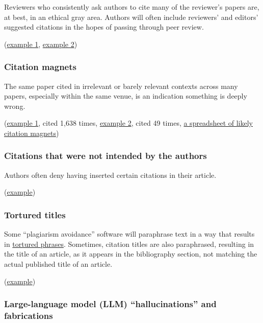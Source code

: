 \documentclass[letterpaper, 12pt]{article}
\begin{document}
Reviewers who consistently ask authors to cite many of the reviewer's papers are, at best, in an ethical gray area. Authors will often include reviewers' and editors' suggested citations in the hopes of passing through peer review.

(\href{https://pubpeer.com/publications/90719DBC6E5FF2AC32FDE74F1A6A7F}{example 1}, \href{https://pubpeer.com/publications/1924F147DE045B97261004EB2387AE}{example 2})

\subsubsection*{Citation magnets}

The same paper cited in irrelevant or barely relevant contexts across many papers,
especially within the same venue, is an indication something is deeply wrong. 

(\href{https://pubpeer.com/search?q=%22A+novel+Aluminum%E2%80%93graphite+dual-Ion+battery%22}{example 1}, cited 1,638 times, \href{https://pubpeer.com/publications/B71DD139D3549DCCA37DCEC8AF59D5}{example 2}, cited 49 times,  \href{https://docs.google.com/spreadsheets/d/1o-9OIyzZ9mMqA7bprcbI5nemtYBfxiXH1ndI3y5A43E/edit?usp=sharing}{a spreadsheet of likely citation magnets})

\subsubsection*{Citations that were not intended by the authors}

Authors often deny having inserted certain citations in their article.

(\href{https://pubpeer.com/publications/8DC24BCCDA68EC1954E1FCA74FDB8E\#2}{example})

\subsubsection*{Tortured titles}

Some ``plagiarism avoidance'' software will paraphrase text in a way that results in \href{https://arxiv.org/abs/2107.06751}{tortured phrases}. Sometimes, citation titles are also paraphrased, resulting in the title of an article, as it appears in the bibliography section, not matching the actual published title of an article.

(\href{https://pubpeer.com/publications/CF328DB7A6131B99F9805B49643D81\#2}{example})

\subsubsection*{Large-language model (LLM) ``hallucinations'' and fabrications}
\end{document}
